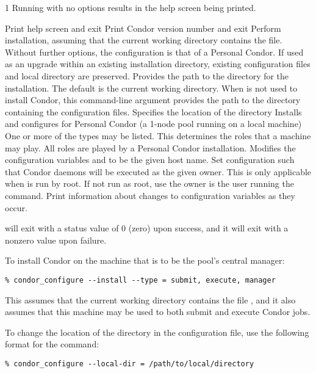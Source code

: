 \begin{ManPage}{\label{man-condor-configure}}{1}
Running  with no options results in the
help screen being printed.

\begin{Options}
	 {Print help screen and exit}
	 {Print Condor version number and exit}
	 {Perform installation, assuming that
	the current working directory contains the 
	file.  Without further options, the configuration is that of
	a Personal Condor.  If used as an upgrade within an existing
	installation directory, existing configuration files and local
	directory are preserved.}
	 {Provides the path to the
	directory for the installation.  The default is the current
	working directory.  When  is not used to
	install Condor, this command-line argument provides the path
	to the directory containing the configuration files.}
	 {Specifies the
	location of the  directory}
	 {Installs and configures
	for Personal Condor (a 1-node pool running on a local machine)}
	 {One
	or more of the types may be listed.
	This determines the roles that a machine may play.
	All roles are played by a Personal Condor installation.}
	 {Modifies
	the configuration variables 
	and  to be the given host name.}
	 {Set configuration
	such that Condor daemons will be executed as the given owner.
	This is only applicable when  is run by root.
	If not run as root,
	use the owner is the user running the  command.
	}
	 {Print information about changes
	to configuration variables as they occur.}
\end{Options}

\ExitStatus

 will exit with a status value of 0 (zero) upon success,
and it will exit with a nonzero value upon failure.

\Examples
To install Condor on the machine that is to be the pool's central manager:
\begin{verbatim}
% condor_configure --install --type = submit, execute, manager
\end{verbatim}
This assumes that the current working directory contains the
file , and it also assumes that this machine
may be used to both submit and execute Condor jobs.

To change the location of the  directory
in the configuration file, use the following format for
the  command:
\begin{verbatim}
% condor_configure --local-dir = /path/to/local/directory
\end{verbatim}
\end{ManPage}
